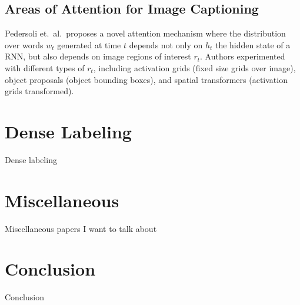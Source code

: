 \documentclass[10pt,twocolumn,letterpaper]{article}
\begin{document}
\subsection{Areas of Attention for Image Captioning}

Pedersoli et.\ al.\ proposes a novel attention mechanism where the
distribution over words $w_t$ generated at time $t$ depends not only on $h_t$
the hidden state of a RNN, but also depends on image regions of interest
$r_t$. Authors experimented with different types of $r_t$, including
activation grids (fixed size grids over image), object proposals (object
bounding boxes), and spatial transformers (activation grids transformed).

\section{Dense Labeling}

Dense labeling

\section{Miscellaneous}

Miscellaneous papers I want to talk about

\section{Conclusion}

Conclusion

{\small


}
\end{document}
